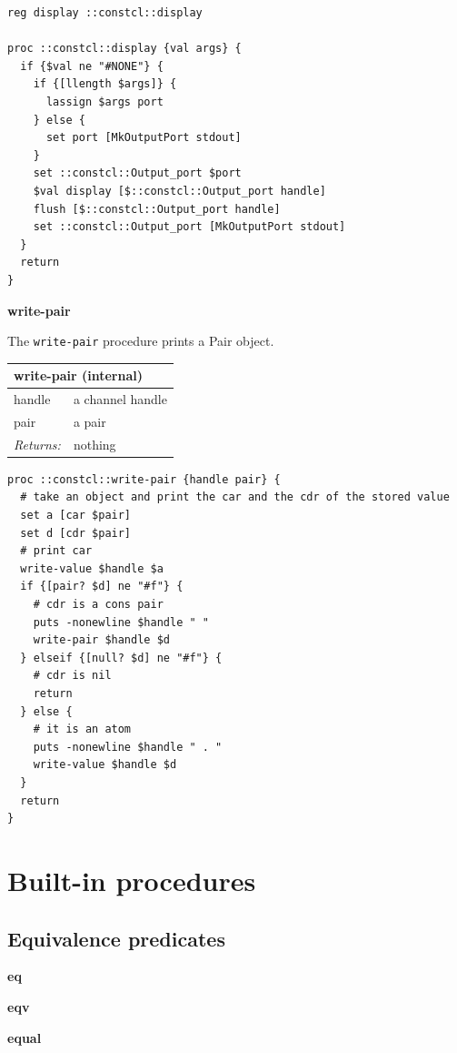 \documentclass[twoside,9pt]{report}
\begin{document}
\noindent\makebox[\linewidth]{\rule{\linewidth}{0.4pt}}
\begin{lstlisting}
reg display ::constcl::display
 
proc ::constcl::display {val args} {
  if {$val ne "#NONE"} {
    if {[llength $args]} {
      lassign $args port
    } else {
      set port [MkOutputPort stdout]
    }
    set ::constcl::Output_port $port
    $val display [$::constcl::Output_port handle]
    flush [$::constcl::Output_port handle]
    set ::constcl::Output_port [MkOutputPort stdout]
  }
  return
}
\end{lstlisting}
\noindent\makebox[\linewidth]{\rule{\linewidth}{0.4pt}}

\textbf{write-pair}


The \texttt{write-pair} procedure prints a Pair object.

\begin{tabular}{ |l l| }
\hline
\multicolumn{2}{|l|}{write-pair (internal)} \\
\hline
handle & a channel handle \\
pair & a pair \\
\textit{Returns:} & nothing \\
\hline
\end{tabular}

\noindent\makebox[\linewidth]{\rule{\linewidth}{0.4pt}}
\begin{lstlisting}
proc ::constcl::write-pair {handle pair} {
  # take an object and print the car and the cdr of the stored value
  set a [car $pair]
  set d [cdr $pair]
  # print car
  write-value $handle $a
  if {[pair? $d] ne "#f"} {
    # cdr is a cons pair
    puts -nonewline $handle " "
    write-pair $handle $d
  } elseif {[null? $d] ne "#f"} {
    # cdr is nil
    return
  } else {
    # it is an atom
    puts -nonewline $handle " . "
    write-value $handle $d
  }
  return
}
\end{lstlisting}
\noindent\makebox[\linewidth]{\rule{\linewidth}{0.4pt}}
\chapter{Built-in procedures}
\label{built-in-procedures}
\section{Equivalence predicates}
\label{equivalence-predicates}

\textbf{eq}


\textbf{eqv}


\textbf{equal}
\end{document}

